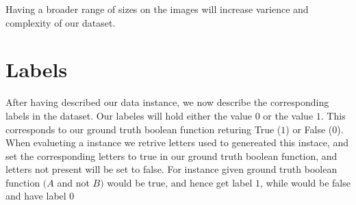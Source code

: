 Having a broader range of sizes on the images will increase varience and complexity of our dataset.

\section{Labels}
After having described our data instance, we now describe the corresponding labels in the dataset.
Our labeles will hold either the value $0$ or the value $1$. This corresponds to our ground truth boolean function returing 
True ($1$) or False ($0$). When evalueting a instance we retrive letters used to genereated this instace,
and set the corresponding letters to true in our ground truth boolean function, and letters not present will be set to false.
For instance given ground truth boolean function $(A $ and not $ B)$  would be true, and hence 
get label $1$, while  would be false and have label $0$
